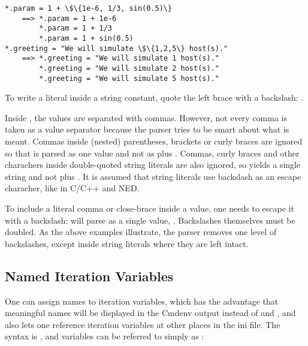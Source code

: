 \begin{Verbatim}[commandchars=\\\{\}]
*.param = 1 + \$\{1e-6, 1/3, sin(0.5)\}
    ==> *.param = 1 + 1e-6
        *.param = 1 + 1/3
        *.param = 1 + sin(0.5)
*.greeting = "We will simulate \$\{1,2,5\} host(s)."
    ==> *.greeting = "We will simulate 1 host(s)."
        *.greeting = "We will simulate 2 host(s)."
        *.greeting = "We will simulate 5 host(s)."
\end{Verbatim}

To write a literal  inside a string constant, quote
the left brace with a backslash: .

\begin{note}
Inside , the values are separated with commas. However,
not every comma is taken as a value separator because the parser
tries to be smart about what is meant. Commas inside (nested) parentheses,
brackets or curly braces are ignored so that  is
parsed as one value and not as  plus . Commas, curly
braces and other charachers inside double-quoted string literals are
also ignored, so  yields a single 
string and not  plus . It is assumed that string literals
use backslash as an escape characher, like in C/C++ and NED.

To include a literal comma or close-brace inside a value, one needs
to escape it with a backslash: 
will parse as a single value, . Backslashes themselves must be doubled.
As the above examples illustrate, the parser removes one level of backslashes,
except inside string literals where they are left intact.
\end{note}


\subsection{Named Iteration Variables}
\label{sec:config-sim:named-iteration-variables}

One can assign names to iteration variables, which has the advantage
that meaningful names will be displayed in the Cmdenv output instead
of  and , and also lets one reference iteration
variables at other places in the ini file. The syntax is
, and variables can be referred to simply as
:

